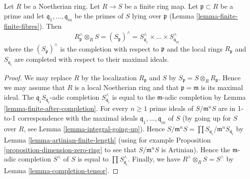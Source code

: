 \begin{lemma}
\label{lemma-completion-finite-extension}
Let $R$ be a Noetherian ring. Let $R \to S$ be a finite ring map.
Let $\mathfrak p \subset R$ be a prime and let
$\mathfrak q_1, \ldots, \mathfrak q_m$ be the primes of $S$
lying over $\mathfrak p$
(Lemma \ref{lemma-finite-finite-fibres}).
Then
$$
R_\mathfrak p^\wedge \otimes_R S =
(S_\mathfrak p)^\wedge =
S_{\mathfrak q_1}^\wedge \times \ldots \times S_{\mathfrak q_m}^\wedge
$$
where the $(S_\mathfrak p)^\wedge$ is the completion with respect to
$\mathfrak p$ and the local rings $R_\mathfrak p$ and
$S_{\mathfrak q_i}$ are completed with respect to their maximal ideals.
\end{lemma}

\begin{proof}
We may replace $R$ by the localization $R_\mathfrak p$ and
$S$ by $S_\mathfrak p = S \otimes_R R_\mathfrak p$.
Hence we may assume that $R$ is a local Noetherian ring and
that $\mathfrak p = \mathfrak m$ is its maximal ideal.
The $\mathfrak q_iS_{\mathfrak q_i}$-adic completion
$S_{\mathfrak q_i}^\wedge$ is equal to the $\mathfrak m$-adic
completion by Lemma \ref{lemma-finite-after-completion}.
For every $n \geq 1$ prime ideals of $S/\mathfrak m^nS$ are in 1-to-1
correspondence with the maximal ideals
$\mathfrak q_1, \ldots, \mathfrak q_m$ of $S$
(by going up for $S$ over $R$, see
Lemma \ref{lemma-integral-going-up}).
Hence
$S/\mathfrak m^nS = \prod S_{\mathfrak q_i}/\mathfrak m^nS_{\mathfrak q_i}$
by Lemma \ref{lemma-artinian-finite-length}
(using for example
Proposition \ref{proposition-dimension-zero-ring}
to see that $S/\mathfrak m^nS$ is Artinian).
Hence the $\mathfrak m$-adic completion $S^\wedge$ of $S$ is equal to
$\prod S_{\mathfrak q_i}^\wedge$. Finally, we have
$R^\wedge \otimes_R S = S^\wedge$ by Lemma \ref{lemma-completion-tensor}.
\end{proof}
